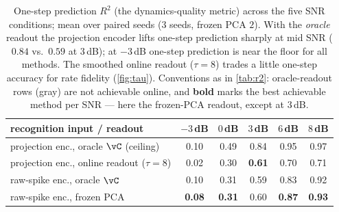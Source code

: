 \documentclass[11pt]{article}
\newcommand{\cgray}[1]{\textcolor{black!50}{#1}}
\begin{document}
\begin{table}[t]
\centering
\caption{One-step prediction $R^2$ (the dynamics-quality metric) across the five SNR conditions;
mean over paired seeds ($3$ seeds, frozen PCA $2$). With the \emph{oracle} readout the projection
encoder lifts one-step prediction sharply at mid SNR ($0.84$ vs.\ $0.59$ at $3$\,dB); at $-3$\,dB
one-step prediction is near the floor for all methods. The smoothed online readout ($\tau{=}8$)
trades a little one-step accuracy for rate fidelity (\cref{fig:tau}). Conventions as in
\cref{tab:r2}: oracle-readout rows (\cgray{gray}) are not achievable online, and \textbf{bold} marks
the best achievable method per SNR --- here the frozen-PCA readout, except at $3$\,dB.}
\label{tab:onestep}
\begin{tabular}{lccccc}
\toprule
recognition input / readout & $-3$\,dB & $0$\,dB & $3$\,dB & $6$\,dB & $8$\,dB\\
\midrule
\cgray{projection enc., oracle $\vC$ (ceiling)}      & \cgray{0.10} & \cgray{0.49} & \cgray{0.84} & \cgray{0.95} & \cgray{0.97}\\
projection enc., online readout ($\tau{=}8$) & 0.02 & 0.30 & \textbf{0.61} & 0.70 & 0.71\\
\cgray{raw-spike enc., oracle $\vC$}          & \cgray{0.10} & \cgray{0.31} & \cgray{0.59} & \cgray{0.83} & \cgray{0.92}\\
raw-spike enc., frozen PCA                    & \textbf{0.08} & \textbf{0.31} & 0.60 & \textbf{0.87} & \textbf{0.93}\\
\bottomrule
\end{tabular}
\end{table}
\end{document}
